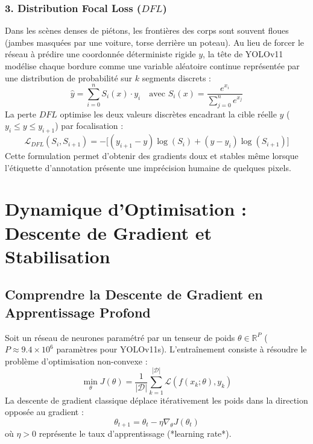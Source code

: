 \documentclass[11pt,a4paper]{article}
\begin{document}
\subsubsection{3. Distribution Focal Loss ($DFL$)}
Dans les scènes denses de piétons, les frontières des corps sont souvent floues (jambes masquées par une voiture, torse derrière un poteau). Au lieu de forcer le réseau à prédire une coordonnée déterministe rigide $y$, la tête de YOLOv11 modélise chaque bordure comme une variable aléatoire continue représentée par une distribution de probabilité sur $k$ segments discrets :
\begin{equation}
    \hat{y} = \sum_{i=0}^{n} S_i(x) \cdot y_i \quad \text{avec } S_i(x) = \frac{e^{x_i}}{\sum_{j=0}^{n} e^{x_j}}
\end{equation}
La perte $DFL$ optimise les deux valeurs discrètes encadrant la cible réelle $y$ ($y_i \le y \le y_{i+1}$) par focalisation :
\begin{equation}
    \mathcal{L}_{DFL}(S_i, S_{i+1}) = - \Big[ (y_{i+1} - y) \log(S_i) + (y - y_i) \log(S_{i+1}) \Big]
\end{equation}
Cette formulation permet d'obtenir des gradients doux et stables même lorsque l'étiquette d'annotation présente une imprécision humaine de quelques pixels.

\section{Dynamique d'Optimisation : Descente de Gradient et Stabilisation}

\subsection{Comprendre la Descente de Gradient en Apprentissage Profond}
Soit un réseau de neurones paramétré par un tenseur de poids $\theta \in \mathbb{R}^P$ ($P \approx 9.4\times 10^6$ paramètres pour YOLOv11s). L'entraînement consiste à résoudre le problème d'optimisation non-convexe :
\begin{equation}
    \min_{\theta} J(\theta) = \frac{1}{|\mathcal{D}|} \sum_{k=1}^{|\mathcal{D}|} \mathcal{L}(f(x_k; \theta), y_k)
\end{equation}
La descente de gradient classique déplace itérativement les poids dans la direction opposée au gradient :
\begin{equation}
    \theta_{t+1} = \theta_t - \eta \nabla_\theta J(\theta_t)
\end{equation}
où $\eta > 0$ représente le taux d'apprentissage (*learning rate*).
\end{document}
